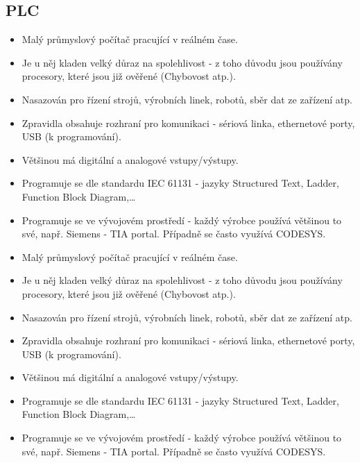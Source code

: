\subsection{PLC}
\begin{itemize}
  \item Malý průmyslový počítač pracující v reálném čase.
  \item Je u něj kladen velký důraz na spolehlivost - z toho důvodu jsou používány procesory, které jsou již ověřené (Chybovost atp.). 
  \item Nasazován pro řízení strojů, výrobních linek, robotů, sběr dat ze zařízení atp.
  \item Zpravidla obsahuje rozhraní pro komunikaci - sériová linka, ethernetové porty, USB (k programování).
  \item Většinou má digitální a analogové vstupy/výstupy.
  \item Programuje se dle standardu IEC 61131 - jazyky Structured Text, Ladder, Function Block Diagram,\dots
  \item Programuje se ve vývojovém prostředí - každý výrobce používá většinou to své, např. Siemens - TIA portal. Případně se často využívá CODESYS.
    \item Malý průmyslový počítač pracující v reálném čase.
    \item Je u něj kladen velký důraz na spolehlivost - z toho důvodu jsou používány procesory, které jsou již ověřené (Chybovost atp.).
    \item Nasazován pro řízení strojů, výrobních linek, robotů, sběr dat ze zařízení atp.
    \item Zpravidla obsahuje rozhraní pro komunikaci - sériová linka, ethernetové porty, USB (k programování).
    \item Většinou má digitální a analogové vstupy/výstupy.
    \item Programuje se dle standardu IEC 61131 - jazyky Structured Text, Ladder, Function Block Diagram,\dots
    \item Programuje se ve vývojovém prostředí - každý výrobce používá většinou to své, např. Siemens - TIA portal. Případně se často využívá CODESYS.
\end{itemize}
